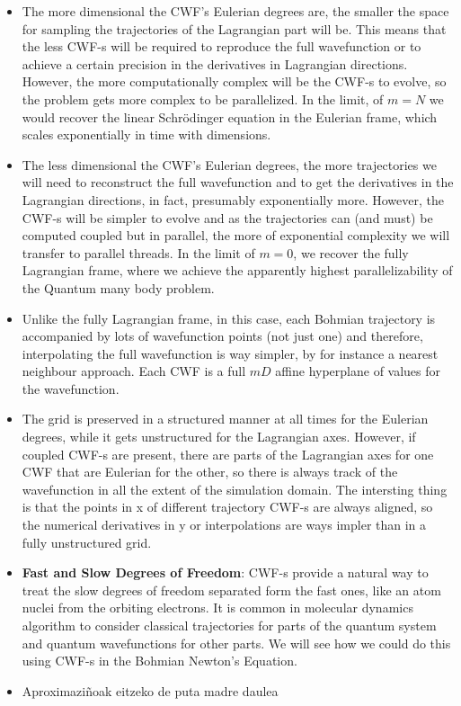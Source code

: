 \documentclass[11pt, a4paper]{article} %
\begin{document}
\begin{itemize}
\item The more dimensional the CWF's Eulerian degrees are, the smaller the space for sampling the trajectories of the Lagrangian part will be. This means that the less CWF-s will be required to reproduce the full wavefunction or to achieve a certain precision in the derivatives in Lagrangian directions. However, the more computationally complex will be the CWF-s to evolve, so the problem gets more complex to be parallelized. In the limit, of $m=N$ we would recover the linear Schrödinger equation in the Eulerian frame, which scales exponentially in time with dimensions.

\item The less dimensional the CWF's Eulerian degrees, the more trajectories we will need to reconstruct the full wavefunction and to get the derivatives in the Lagrangian directions, in fact, presumably exponentially more. However, the CWF-s will be simpler to evolve and as the trajectories can (and must) be computed coupled but in parallel, the more of exponential complexity we will transfer to parallel threads. In the limit of $m=0$, we recover the fully Lagrangian frame, where we achieve the apparently highest parallelizability of the Quantum many body problem.

\item Unlike the fully Lagrangian frame, in this case, each Bohmian trajectory is accompanied by lots of wavefunction points (not just one) and therefore, interpolating the full wavefunction is way simpler, by for instance a nearest neighbour approach. Each CWF is a full $mD$ affine hyperplane of values for the wavefunction.

\item The grid is preserved in a structured manner at all times for the Eulerian degrees, while it gets unstructured for the Lagrangian axes. However, if coupled CWF-s are present, there are parts of the Lagrangian axes for one CWF that are Eulerian for the other, so there is always track of the wavefunction in all the extent of the simulation domain. The intersting thing is that the points in x of different trajectory CWF-s are always aligned, so the numerical derivatives in y or interpolations are ways impler than in a fully unstructured grid.

\item {\bf Fast and Slow Degrees of Freedom}: CWF-s provide a natural way to treat the slow degrees of freedom separated form the fast ones, like an atom nuclei from the orbiting electrons. It is common in molecular dynamics algorithm to consider classical trajectories for parts of the quantum system and quantum wavefunctions for other parts. We will see how we could do this using CWF-s in the Bohmian Newton's Equation.
\item Aproximaziñoak eitzeko de puta madre daulea
\end{itemize}
\end{document}
